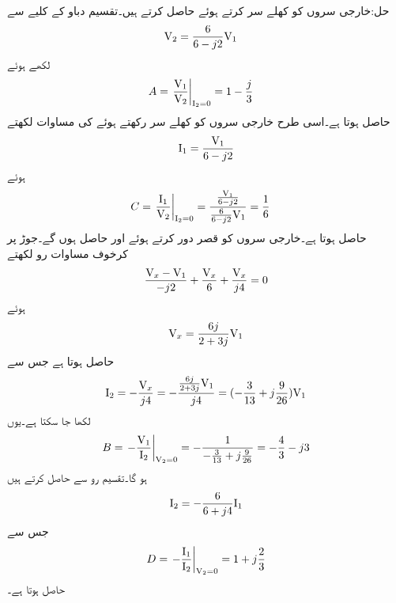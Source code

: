 حل:خارجی سروں کو کھلے سر کرتے ہوئے  حاصل کرتے ہیں۔تقسیم دباو کے کلیے سے
\begin{align*}
{\ensuremath{{\textup{V}}}}_2&=\frac{6}{6-j2}{{\textup{V}}}_1
\end{align*}
لکھے ہوئے 
\begin{align*}
A&=\left.\frac{{{\textup{V}}}_1}{{{\textup{V}}}_2} \right|_{{{\textup{I}}}_2=0}=1-\frac{j}{3}
\end{align*}
حاصل ہوتا ہے۔اسی طرح  خارجی سروں کو کھلے سر رکھتے ہوئے  کی مساوات لکھتے
\begin{align*}
{\ensuremath{{\textup{I}}}}_1=\frac{{{\textup{V}}}_1}{6-j2}
\end{align*} 
ہوئے
\begin{align*}
C&=\left.\frac{{{\textup{I}}}_1}{{{\textup{V}}}_2} \right|_{{{\textup{I}}}_2=0}=\frac{\frac{{{\textup{V}}}_1}{6-j2}}{\frac{6}{6-j2}{{\textup{V}}}_1}=\frac{1}{6}
\end{align*}
حاصل ہوتا ہے۔خارجی سروں کو قصر دور کرتے ہوئے  اور  حاصل ہوں گے۔جوڑ  پر کرخوف مساوات رو لکھتے
\begin{align*}
\frac{{{\textup{V}}}_x-{{\textup{V}}}_1}{-j2}+\frac{{{\textup{V}}}_x}{6}+\frac{{{\textup{V}}}_x}{j4}=0
\end{align*}
ہوئے
\begin{align*}
{\ensuremath{{\textup{V}}}}_x=\frac{6j}{2+3j}{{\textup{V}}}_1
\end{align*}
حاصل ہوتا ہے جس سے 
\begin{align*}
{\ensuremath{{\textup{I}}}}_2=-\frac{{{\textup{V}}}_x}{j4}=-\frac{\frac{6j}{2+3j}{{\textup{V}}}_1}{j4}=(-\frac{3}{13}+j\frac{9}{26}){{\textup{V}}}_1
\end{align*}
لکھا جا سکتا ہے۔یوں
\begin{align*}
B=\left. -\frac{{{\textup{V}}}_1}{{{\textup{I}}}_2}\right|_{{{\textup{V}}}_2=0}=-\frac{1}{-\frac{3}{13}+j\frac{9}{26}}=-\frac{4}{3}-j3
\end{align*}
ہو گا۔تقسیم رو سے  حاصل کرتے ہیں
\begin{align*}
{\ensuremath{{\textup{I}}}}_2=-\frac{6}{6+j4}{{\textup{I}}}_1
\end{align*}
جس سے 
\begin{align*}
D=\left. -\frac{{{\textup{I}}}_1}{{{\textup{I}}}_2}\right|_{{{\textup{V}}}_2=0}=1+j\frac{2}{3}
\end{align*}
حاصل ہوتا ہے۔

